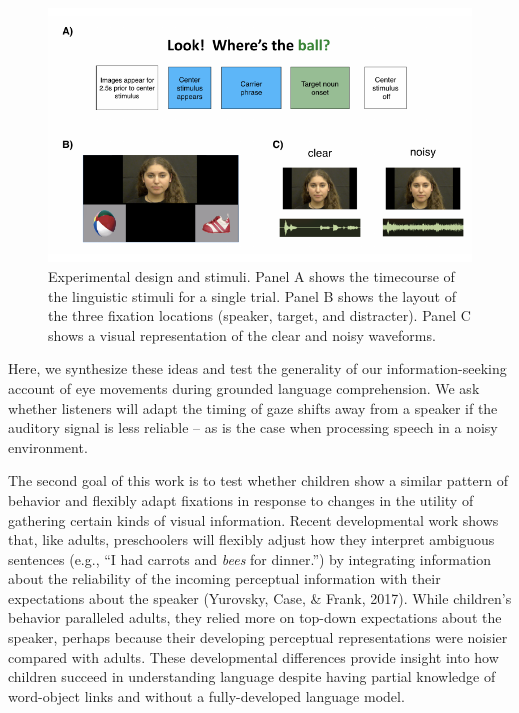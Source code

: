 \documentclass[10pt, letterpaper]{article}
\newenvironment{CodeChunk}{}{}
\begin{document}
\begin{CodeChunk}
\begin{figure}[tb]

{\centering \includegraphics[width=0.85\linewidth]{figs/stimuli_plot-1} 

}

\caption[Experimental design and stimuli]{Experimental design and stimuli. Panel A shows the timecourse of the linguistic stimuli for a single trial. Panel B shows the layout of the three fixation locations (speaker, target, and distracter). Panel C shows a visual representation of the clear and noisy waveforms.}\label{fig:stimuli_plot}
\end{figure}
\end{CodeChunk}

Here, we synthesize these ideas and test the generality of our
information-seeking account of eye movements during grounded language
comprehension. We ask whether listeners will adapt the timing of gaze
shifts away from a speaker if the auditory signal is less reliable -- as
is the case when processing speech in a noisy environment.

The second goal of this work is to test whether children show a similar
pattern of behavior and flexibly adapt fixations in response to changes
in the utility of gathering certain kinds of visual information. Recent
developmental work shows that, like adults, preschoolers will flexibly
adjust how they interpret ambiguous sentences (e.g., ``I had carrots and
\emph{bees} for dinner.'') by integrating information about the
reliability of the incoming perceptual information with their
expectations about the speaker (Yurovsky, Case, \& Frank, 2017). While
children's behavior paralleled adults, they relied more on top-down
expectations about the speaker, perhaps because their developing
perceptual representations were noisier compared with adults. These
developmental differences provide insight into how children succeed in
understanding language despite having partial knowledge of word-object
links and without a fully-developed language model.
\end{document}
